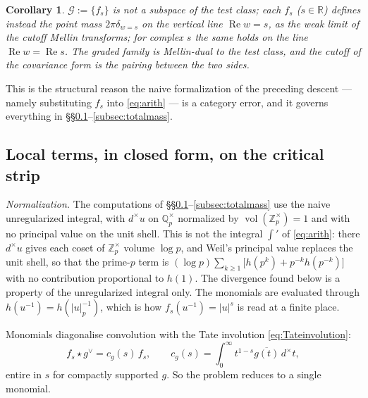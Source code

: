 \documentclass[11pt]{amsart}
\newtheorem{corollary}[theorem]{Corollary}
\theoremstyle{definition}
\theoremstyle{remark}
\newcommand{\R}{\mathbb R}
\newcommand{\Z}{\mathbb Z}
\newcommand{\Q}{\mathbb Q}
\newcommand{\Rel}{\operatorname{Re}}
\newcommand{\Gr}{\mathcal G}
\begin{document}
\begin{corollary}\label{cor:duality}
$\Gr:=\{f_s\}$ is not a subspace of the test class; each $f_s$
($s\in\R$) defines instead the point mass $2\pi\delta_{w=s}$ on the
vertical line $\Rel w=s$, as the weak limit of the cutoff Mellin
transforms; for complex $s$ the same holds on the line $\Rel w=\Rel s$.  The graded
family is Mellin-dual to the test class, and the cutoff of the covariance
form is the pairing between the two sides.
\end{corollary}

This is the structural reason the naive formalization of the preceding descent --- namely
substituting $f_s$ into \eqref{eq:arith} --- is a category error, and it
governs everything in
\S\S\ref{subsec:localterms}--\ref{subsec:totalmass}.

\subsection{Local terms, in closed form, on the critical strip}
\label{subsec:localterms}

\emph{Normalization.}  The computations of
\S\S\ref{subsec:localterms}--\ref{subsec:totalmass} use the naive
unregularized integral, with $d^\times u$ on $\Q_p^\times$ normalized by
$\operatorname{vol}(\Z_p^\times)=1$ and with no principal value on the unit
shell.  This is not the integral $\int'$ of \eqref{eq:arith}: there
$d^\times u$ gives each coset of $\Z_p^\times$ volume $\log p$, and Weil's
principal value replaces the unit shell, so that the prime-$p$ term is
$(\log p)\sum_{k\ge1}\big[h(p^k)+p^{-k}h(p^{-k})\big]$ with no contribution
proportional to $h(1)$.  The divergence found below is a property of the
unregularized integral only.  The monomials are evaluated through
$h(u^{-1})=h(|u|_p^{-1})$, which is how $f_s(u^{-1})=|u|^s$ is read at a
finite place.

Monomials diagonalise convolution with the Tate involution
\eqref{eq:Tateinvolution}:
\begin{equation}\label{eq:eigen}
 f_s\star g^\vee=c_g(s)\,f_s,
 \qquad
 c_g(s)=\int_0^\infty t^{1-s}\overline{g(t)}\,d^\times t,
\end{equation}
entire in $s$ for compactly supported $g$.  So the problem reduces to a
single monomial.
\end{document}
